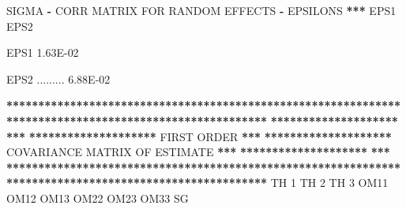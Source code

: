 \documentclass[
  11pt,
  krantz2, a4paper, twoside]{krantz}
\newenvironment{Shaded}{\begin{snugshade}}{\end{snugshade}}
\newcommand{\DecValTok}[1]{\textcolor[rgb]{0.00,0.00,0.81}{#1}}
\newcommand{\ErrorTok}[1]{\textcolor[rgb]{0.64,0.00,0.00}{\textbf{#1}}}
\newcommand{\FloatTok}[1]{\textcolor[rgb]{0.00,0.00,0.81}{#1}}
\newcommand{\NormalTok}[1]{#1}
\newcommand{\OperatorTok}[1]{\textcolor[rgb]{0.81,0.36,0.00}{\textbf{#1}}}
\newcommand{\StringTok}[1]{\textcolor[rgb]{0.31,0.60,0.02}{#1}}
\theoremstyle{definition}
\theoremstyle{definition}
\theoremstyle{definition}
\theoremstyle{remark}
\begin{document}
\begin{Shaded}
\begin{Highlighting}[]
\NormalTok{SIGMA }\OperatorTok{{-}}\StringTok{ }\NormalTok{CORR MATRIX FOR RANDOM EFFECTS }\OperatorTok{{-}}\StringTok{ }\NormalTok{EPSILONS  }\OperatorTok{**}\ErrorTok{*}\StringTok{                                                 }
\StringTok{                                                                                                       }
\StringTok{                                                                                                       }
\StringTok{        }\NormalTok{EPS1      EPS2                                                                                 }
                                                                                                       
\NormalTok{EPS1    }\FloatTok{1.63E{-}02}                                                                                       
                                                                                                       
\NormalTok{EPS2   .........  }\FloatTok{6.88E{-}02}                                                                             
                                                                                                       
                                                                                                       
\OperatorTok{**}\ErrorTok{*****************************************************************************************************}
\ErrorTok{********************}\StringTok{                                                                                }\ErrorTok{***}
\ErrorTok{********************}\StringTok{                                   }\NormalTok{FIRST ORDER                                  }\OperatorTok{**}\ErrorTok{*}
\ErrorTok{********************}\StringTok{                          }\NormalTok{COVARIANCE MATRIX OF ESTIMATE                         }\OperatorTok{**}\ErrorTok{*}
\ErrorTok{********************}\StringTok{                                                                                }\ErrorTok{***}
\ErrorTok{*******************************************************************************************************}
\StringTok{                                                                                                       }
\StringTok{                                                                                                       }
\StringTok{           }\NormalTok{TH }\DecValTok{1}\NormalTok{      TH }\DecValTok{2}\NormalTok{      TH }\DecValTok{3}\NormalTok{      OM11      OM12      OM13      OM22      OM23      OM33      SG}
                                                                                                       

\end{Highlighting}
\end{Shaded}
\end{document}
